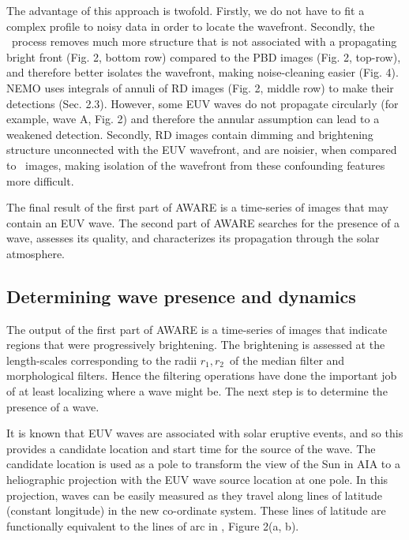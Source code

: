 The advantage of this approach is twofold. Firstly, we do not have to
fit a complex profile to noisy data in order to locate the
wavefront. Secondly, the \RDP\ process removes much more structure
that is not associated with a propagating bright front (Fig. 2, bottom
row) compared to the PBD images (Fig. 2, top-row), and therefore
better isolates the wavefront, making noise-cleaning easier (Fig. 4).
NEMO \citep{2005SoPh..228..265P} uses integrals of annuli of RD images
(Fig. 2, middle row) to make their detections (Sec. 2.3). However,
some EUV waves do not propagate circularly (for example, wave A,
Fig. 2) and therefore the annular assumption can lead to a weakened
detection.  Secondly, RD images contain dimming and brightening
structure unconnected with the EUV wavefront, and are noisier, when
compared to \RDP\ images, making isolation of the wavefront from these
confounding features more difficult.

The final result of the first part of AWARE is a time-series of images
that may contain an EUV wave.  The second part of AWARE searches for
the presence of a wave, assesses its quality, and characterizes its
propagation through the solar atmosphere.

\subsection{Determining wave presence and
  dynamics}\label{sec:aware:dynamics}

The output of the first part of AWARE is a time-series of images that
indicate regions that were progressively brightening.  The brightening
is assessed at the length-scales corresponding to the radii $r_{1},
r_{2}$\textellipsis\ of the median filter and morphological filters.
Hence the filtering operations have done the important job of at least
localizing where a wave might be.  The next step is to determine the
presence of a wave.

It is known that EUV waves are associated with solar eruptive events,
and so this provides a candidate location and start time for the
source of the wave. The candidate location is used as a pole to
transform the view of the Sun in AIA to a heliographic projection with
the EUV wave source location at one pole.  In this projection, waves
can be easily measured as they travel along lines of latitude
(constant longitude) in the new co-ordinate system.  These lines of
latitude are functionally equivalent to the lines of arc in
\citet{2014SoPh..289.3279L}, Figure 2(a, b).

